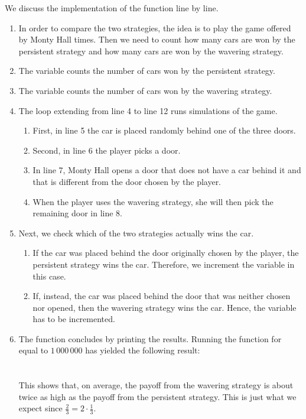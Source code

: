     
We discuss the implementation of the function  line by line.
\begin{enumerate}
\item In order to compare the two strategies, the idea is to play the game offered by Monty Hall
       times.  Then we need to count how many cars are won by the persistent strategy and how
      many cars are won by the wavering strategy.
\item The variable  counts the number of cars won by the persistent strategy.
\item The variable   counts the number of cars won by the wavering  strategy.
\item The  loop extending from line 4 to line 12 runs  simulations of the
       game.
       \begin{enumerate}
       \item First, in line 5 the car is placed randomly behind one of the three doors.
       \item Second, in line 6 the player picks a door.
       \item In line 7, Monty Hall opens a door that does not have a car behind it and that
             is different from the door chosen by the player.
       \item When the player uses the wavering strategy, she will then pick the remaining door in line 8.
       \end{enumerate}
\item Next, we check which of the two strategies actually wins the car.
      \begin{enumerate}
      \item If the car was placed behind the door originally chosen by the player, the persistent
            strategy wins the car.  Therefore, we increment the variable  in
            this case.
      \item If, instead, the car was placed behind the door that was neither chosen nor opened, then
            the wavering strategy wins the car.  Hence, the variable  has to be incremented.
      \end{enumerate}
\item The function concludes by printing the results.  Running the function for  equal to
      $1\,000\,000$ has yielded the following result:
      \\[0.2cm]
      \hspace*{1.3cm}
       \\ 
      \hspace*{1.3cm}
      \\[0.2cm]
      This shows that, on average, the payoff from the wavering strategy is about twice as high as the
      payoff from the persistent strategy.  This is just what we expect since $\frac{2}{3} = 2 \cdot \frac{1}{3}$.
\end{enumerate}

